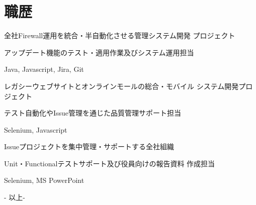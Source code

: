 \documentclass[]{deedy-resume-openfont}
\begin{document}
\begin{minipage}[t]{0.55\textwidth}
\section{職歴}
\sectionsep

\begin{tightemize}
\item 全社Firewall運用を統合・半自動化させる管理システム開発
プロジェクト
\item アップデート機能のテスト・適用作業及びシステム運用担当
\item Java, Javascript, Jira, Git
\end{tightemize}
\sectionsep

\begin{tightemize}
\item レガシーウェブサイトとオンラインモールの総合・モバイル
システム開発プロジェクト
\item テスト自動化やIssue管理を通じた品質管理サポート担当
\item Selenium, Javascript
\end{tightemize}
\sectionsep

\begin{tightemize}
\item Issueプロジェクトを集中管理・サポートする全社組織
\item Unit・Functionalテストサポート及び役員向けの報告資料
作成担当
\item Selenium, MS PowerPoint
\end{tightemize}
\sectionsep

\sectionsep
\sectionsep
\centering
- 以上- 

\end{minipage} 
\end{document}
